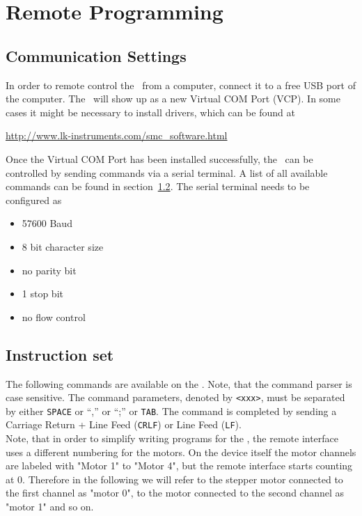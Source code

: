 
\section{Remote Programming}
\label{chp:remote_programming}
\subsection{Communication Settings}
In order to remote control the \productName ~from a computer, connect it to a free USB port of the computer. The \productName ~will show up as a new Virtual COM Port (VCP). In some cases it might be necessary to install drivers, which can be found at
\begin{center}
  \url{http://www.lk-instruments.com/smc_software.html}
\end{center}
Once the Virtual COM Port has been installed successfully, the \productName ~can be controlled by sending commands via a serial terminal. A list of all available commands can be found in section~\ref{section_instruction_set}. The serial terminal needs to be configured as
\begin{itemize}
\item 57600 Baud
\item 8 bit character size
\item no parity bit
\item 1 stop bit
\item no flow control
\end{itemize}

\subsection{Instruction set}
\label{section_instruction_set}
The following commands are available on the \productName .
Note, that the command parser is case sensitive. The command
parameters, denoted by \texttt{<xxx>}, must be separated by
either \texttt{SPACE} or ``,'' or ``;'' or \texttt{TAB}. The
command is completed by sending a  Carriage Return + Line Feed
(\texttt{CRLF}) or Line Feed (\texttt{LF}).\\
Note, that in order to simplify writing programs for the \productName , the remote interface uses a different numbering for the motors. On the device itself the motor channels are labeled with "Motor 1" to "Motor 4", but the remote interface starts counting at 0. Therefore in the following we will refer to the stepper motor connected to the first channel as "motor 0", to the motor connected to the second channel as "motor 1" and so on.

